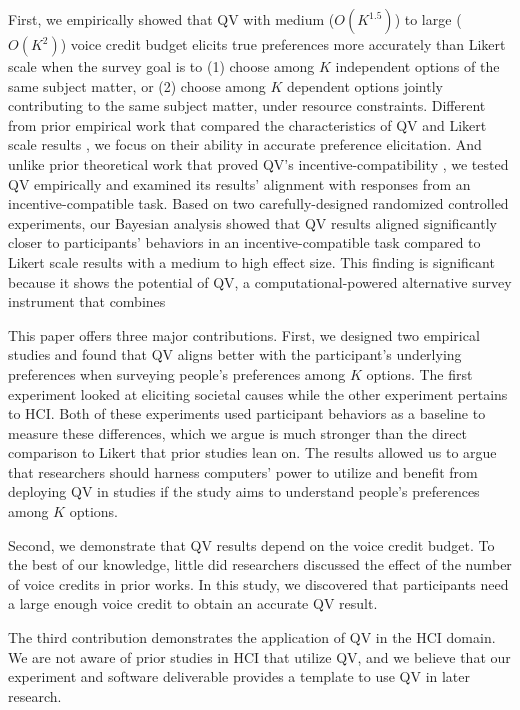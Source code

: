 First, we empirically showed that QV with medium ($O(K^{1.5})$) to large ($O(K^{2})$) voice credit budget elicits true preferences more accurately than Likert scale when the survey goal is to (1) choose among $K$ independent options of the same subject matter, or (2) choose among $K$ dependent options jointly contributing to the same subject matter, under resource constraints. Different from prior empirical work that compared the characteristics of QV and Likert scale results \cite{quarfoot2017quadratic, naylor2017first}, we focus on their ability in accurate preference elicitation. And unlike prior theoretical work that proved QV's incentive-compatibility \cite{lalley2018quadratic, posner2018radical}, we tested QV empirically and examined its results' alignment with responses from an incentive-compatible task. Based on two carefully-designed randomized controlled experiments, our Bayesian analysis showed that QV results aligned significantly closer to participants' behaviors in an incentive-compatible task compared to Likert scale results with a medium to high effect size. This finding is significant because it shows the potential of QV, a computational-powered alternative survey instrument that combines 

This paper offers three major contributions.
First, we designed two empirical studies and found that QV aligns better with the participant's underlying preferences when surveying people's preferences among $K$ options. The first experiment looked at eliciting societal causes while the other experiment pertains to HCI. Both of these experiments used participant behaviors as a baseline to measure these differences, which we argue is much stronger than the direct comparison to Likert that prior studies lean on. The results allowed us to argue that researchers should harness computers' power to utilize and benefit from deploying QV in studies if the study aims to understand people's preferences among $K$ options.

Second, we demonstrate that QV results depend on the voice credit budget. To the best of our knowledge, little did researchers discussed the effect of the number of voice credits in prior works. In this study, we discovered that participants need a large enough voice credit to obtain an accurate QV result.

The third contribution demonstrates the application of QV in the HCI domain. We are not aware of prior studies in HCI that utilize QV, and we believe that our experiment and software deliverable provides a template to use QV in later research.

